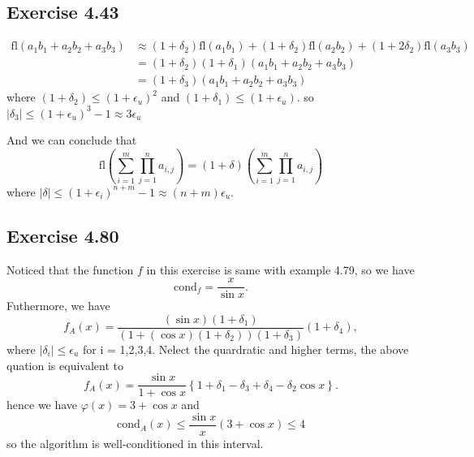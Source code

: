 \documentclass[a4paper]{article}
\newcommand{\fl}{\text{fl}}
\newcommand{\abs}[1]{\left|#1\right|}
\begin{document}
\subsection*{Exercise 4.43}
\begin{align*}
  \fl(a_1b_1 + a_2b_2 + a_3b_3) &\approx (1+\delta_2) \fl(a_1b_1) + (1+\delta_2) \fl(a_2b_2) + (1+2\delta_2) \fl(a_3b_3)\\
&= (1+\delta_2)(1 + \delta_1)(a_1b_1 + a_2b_2 + a_3b_3)\\
 &= (1+\delta_3)(a_1b_1 + a_2b_2 + a_3b_3)
\end{align*}
where $(1 + \delta_2) \leq (1+\epsilon_u)^2$ and $(1+\delta_1) \leq (1+\epsilon_u)$. so $\abs{\delta_3} \leq (1+\epsilon_u)^3-1\approx3\epsilon_u$

And we can conclude that 
\[
\fl (\sum_{i = 1}^{m}\prod_{j = 1}^{n}a_{i,j}) = (1+\delta)(\sum_{i = 1}^{m}\prod_{j = 1}^{n}a_{i,j})
\]
where $\abs{\delta} \leq (1+\epsilon_i)^{n+m}-1\approx (n+m)\epsilon_u$.

\subsection*{Exercise 4.80}
Noticed that the function $f$ in this exercise is same with example 4.79, so we have \[\text{cond}_f = \frac{x}{\sin x}.\]
Futhermore, we have \[f_A(x) = \frac{(\sin x)(1+\delta_1)}{(1+(\cos x)(1+\delta_2))(1+\delta_3)}(1+\delta_4),\] where $\abs{\delta_i} \leq \epsilon_u$ for i = 1,2,3,4.
Nelect the quardratic and higher terms, the above quation is equivalent to \[f_A(x) = \frac{\sin x}{1+ \cos x} \left\{1+\delta_1-\delta_3+\delta_4-\delta_2\cos x\right\}.\]
hence we have $\varphi(x) = 3 + \cos x$ and \[\text{cond}_A(x)\leq \frac{\sin x}{x}(3+\cos x) \leq 4\]
so the algorithm is well-conditioned in this interval.
\end{document}
